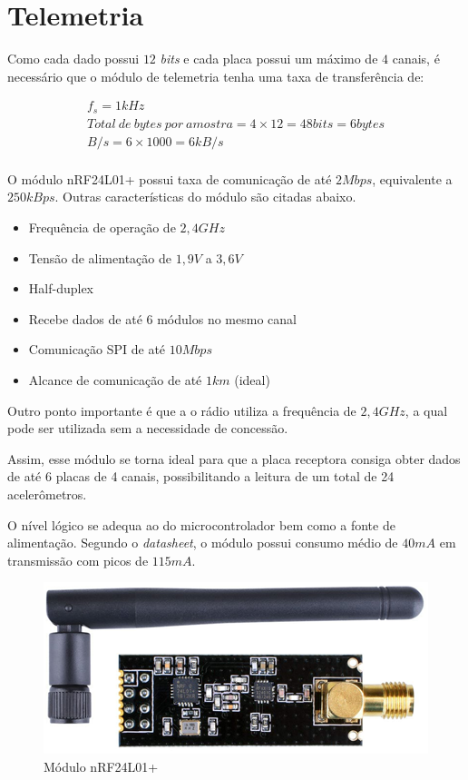 \documentclass[
	12pt,				%
	openright,			%
	twoside,			%
	a4paper,			%
	english,			%
	french,				%
	spanish,			%
	brazil,				%
	]{abntex2}
\begin{document}
	\section{Telemetria}
		Como cada dado possui $12$ \textit{bits} e cada placa possui um
		máximo de $4$ canais, é necessário que o módulo de telemetria
		tenha uma taxa de transferência de:

		\begin{gather*}
			f_s = 1kHz\\
			Total\:de\:bytes\:por\:amostra = 4\times 12 = 48 bits = 6 bytes\\
			B/s = 6\times 1000 = 6kB/s\\
		\end{gather*}

		O módulo nRF24L01+\cite{nrf} possui taxa de comunicação de até $2Mbps$,
		equivalente a $250kBps$. Outras características do módulo são
		citadas abaixo.

		\begin{itemize}
			\item Frequência de operação de $2,4GHz$
			\item Tensão de alimentação de $1,9V$ a $3,6V$
			\item Half-duplex
			\item Recebe dados de até 6 módulos no mesmo canal
			\item Comunicação SPI de até $10Mbps$
			\item Alcance de comunicação de até $1km$ (ideal)
		\end{itemize}

		Outro ponto importante é que a o rádio utiliza a frequência de $2,4GHz$, a qual pode ser utilizada sem a necessidade de concessão.

		Assim, esse módulo se torna ideal para que a placa receptora consiga
		obter dados de até 6 placas de 4 canais, possibilitando a leitura de
		um total de 24 acelerômetros.

		O nível lógico se adequa ao do microcontrolador bem como a fonte
		de alimentação. Segundo o \textit{datasheet}, o módulo possui
		consumo médio de $40mA$ em transmissão com picos de $115mA$.
		
		\begin{figure}[!ht]
			\centering
			\includegraphics[scale = 0.6]{../Fotos/nrf.png}
			\caption[Módulo nRF24L01+]{Módulo nRF24L01+ \footnotemark}
		\end{figure}
\end{document}
